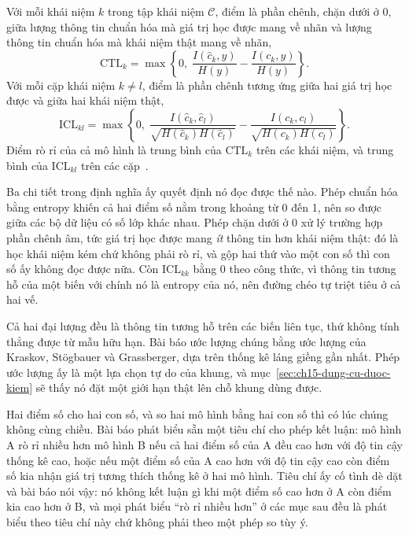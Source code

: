 %
\begin{definition}
\label{def:ch15-hai-diem-so}
Với mỗi khái niệm $k$ trong tập khái niệm $\mathcal{C}$, điểm
 là phần chênh, chặn dưới ở
0, giữa lượng thông tin chuẩn hóa
mà giá trị học được mang về nhãn và lượng thông tin chuẩn hóa mà khái niệm thật
mang về nhãn,
\[
  \mathrm{CTL}_k
  = \max\!\left\{0,\; \frac{I(\hat c_k, y)}{H(y)} - \frac{I(c_k, y)}{H(y)}\right\} .
\]
Với mỗi cặp khái niệm $k \ne l$, điểm  là phần chênh tương ứng giữa hai giá trị học được và giữa hai khái niệm
thật,
\[
  \mathrm{ICL}_{kl}
  = \max\!\left\{0,\;
    \frac{I(\hat c_k, \hat c_l)}{\sqrt{H(\hat c_k)H(\hat c_l)}}
    - \frac{I(c_k, c_l)}{\sqrt{H(c_k)H(c_l)}}\right\} .
\]
Điểm rò rỉ của cả mô hình là trung bình của $\mathrm{CTL}_k$ trên các khái niệm,
và trung bình của $\mathrm{ICL}_{kl}$ trên các cặp~\autocite{p30leakage}.
\end{definition}

Ba chi tiết trong định nghĩa ấy quyết định nó đọc được thế nào. Phép chuẩn hóa bằng entropy khiến
cả hai điểm số nằm trong khoảng từ 0 đến 1, nên so được giữa các bộ dữ liệu có
số lớp khác nhau. Phép chặn dưới ở 0 xử lý trường hợp phần chênh âm, tức giá trị
học được mang \emph{ít} thông tin hơn khái niệm thật: đó là học khái niệm kém
chứ không phải rò rỉ, và gộp hai thứ vào một con số thì con số ấy không đọc được
nữa. Còn $\mathrm{ICL}_{kk}$ bằng 0 theo công thức, vì thông tin tương hỗ của
một biến với chính nó là entropy của nó, nên đường chéo tự triệt tiêu ở cả hai
vế.

Cả hai đại lượng đều là thông tin tương hỗ trên các biến liên tục, thứ không
tính thẳng được từ mẫu hữu hạn. Bài báo ước lượng chúng bằng ước lượng của
Kraskov, Stögbauer và Grassberger, dựa trên thống kê láng giềng gần nhất. Phép
ước lượng ấy là một
lựa chọn tự do của khung, và mục~\ref{sec:ch15-dung-cu-duoc-kiem} sẽ thấy nó đặt
một giới hạn thật lên chỗ khung dùng được.

%
Hai điểm số cho hai con số, và so hai mô hình bằng hai con số thì có lúc chúng
không cùng chiều. Bài báo phát biểu sẵn một tiêu chí cho phép kết luận: mô hình
A rò rỉ nhiều hơn mô hình B nếu cả hai điểm số của A đều cao hơn với độ tin cậy
thống kê cao, hoặc nếu một điểm số của A cao hơn với độ tin cậy cao còn điểm số
kia nhận giá trị tương thích thống kê ở hai mô hình. Tiêu chí ấy cố tình dè dặt
và bài báo nói vậy: nó không kết luận gì khi một điểm số cao hơn ở A còn điểm
kia cao hơn ở B, và mọi phát biểu \enquote{rò rỉ nhiều hơn} ở các mục sau đều là
phát biểu theo tiêu chí này chứ không phải theo một phép so tùy ý.
